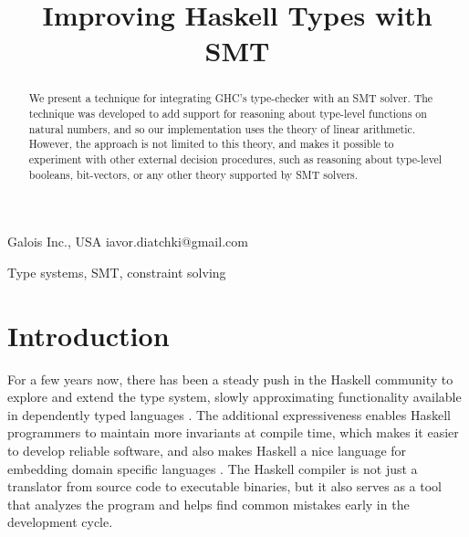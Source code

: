 \documentclass{sigplanconf}
\begin{document}
\toappear{}

\setlength{\pdfpageheight}{\paperheight}
\setlength{\pdfpagewidth}{\paperwidth}



\title{Improving Haskell Types with SMT}

           {Galois Inc., USA}
           {iavor.diatchki@gmail.com}

\maketitle

\begin{abstract}
We present a technique for integrating GHC's type-checker with an SMT solver.
The technique was developed to add support for reasoning
about type-level functions on natural numbers, and so our implementation
uses the theory of linear arithmetic.  However, the approach is not
limited to this theory, and makes it possible to experiment with other
external decision procedures, such as reasoning about type-level booleans,
bit-vectors, or any other theory supported by SMT solvers.
\end{abstract}

\keywords Type systems, SMT, constraint solving

\section{Introduction}

For a few years now, there has been a steady push in the Haskell
community to explore and extend the type system, slowly approximating
functionality available in dependently typed languages
\cite{Eisenberg2012,Lindley2013,Eisenberg2014}.  The additional
expressiveness enables Haskell programmers to maintain more
invariants at compile time, which makes it easier to develop
reliable software, and also makes Haskell a nice language
for embedding domain specific languages \cite{ivory-experience}.
The Haskell compiler is not just a translator from source code
to executable binaries, but it also serves as a tool that
analyzes the program and helps find common mistakes early
in the development cycle.
\end{document}
